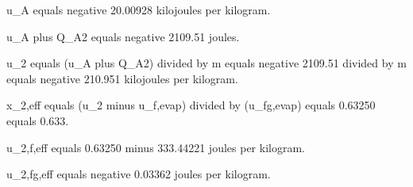 u_A equals negative 20.00928 kilojoules per kilogram.  

u_A plus Q_A2 equals negative 2109.51 joules.  

u_2 equals (u_A plus Q_A2) divided by m equals negative 2109.51 divided by m equals negative 210.951 kilojoules per kilogram.  

x_2,eff equals (u_2 minus u_f,evap) divided by (u_fg,evap) equals 0.63250 equals 0.633.  

u_2,f,eff equals 0.63250 minus 333.44221 joules per kilogram.  

u_2,fg,eff equals negative 0.03362 joules per kilogram.